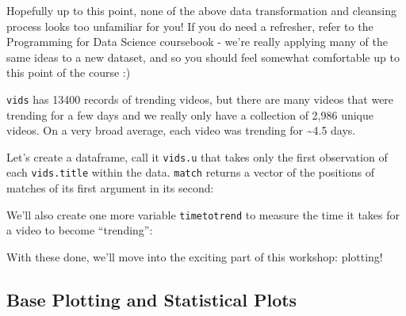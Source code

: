 \documentclass[]{article}
\newenvironment{Shaded}{\begin{snugshade}}{\end{snugshade}}
\newcommand{\DecValTok}[1]{\textcolor[rgb]{0.00,0.00,0.81}{#1}}
\newcommand{\KeywordTok}[1]{\textcolor[rgb]{0.13,0.29,0.53}{\textbf{#1}}}
\newcommand{\NormalTok}[1]{#1}
\newcommand{\OperatorTok}[1]{\textcolor[rgb]{0.81,0.36,0.00}{\textbf{#1}}}
\newcommand{\StringTok}[1]{\textcolor[rgb]{0.31,0.60,0.02}{#1}}
\begin{document}
Hopefully up to this point, none of the above data transformation and
cleansing process looks too unfamiliar for you! If you do need a
refresher, refer to the Programming for Data Science coursebook - we're
really applying many of the same ideas to a new dataset, and so you
should feel somewhat comfortable up to this point of the course :)

\texttt{vids} has 13400 records of trending videos, but there are many
videos that were trending for a few days and we really only have a
collection of 2,986 unique videos. On a very broad average, each video
was trending for \textasciitilde{}4.5 days.

Let's create a dataframe, call it \texttt{vids.u} that takes only the
first observation of each \texttt{vids.title} within the data.
\texttt{match} returns a vector of the positions of matches of its first
argument in its second:

\begin{Shaded}
\end{Shaded}

We'll also create one more variable \texttt{timetotrend} to measure the
time it takes for a video to become ``trending'':

\begin{Shaded}
\end{Shaded}

With these done, we'll move into the exciting part of this workshop:
plotting!

\hypertarget{base-plotting-and-statistical-plots}{%
\subsection{Base Plotting and Statistical
Plots}\label{base-plotting-and-statistical-plots}}
\end{document}
